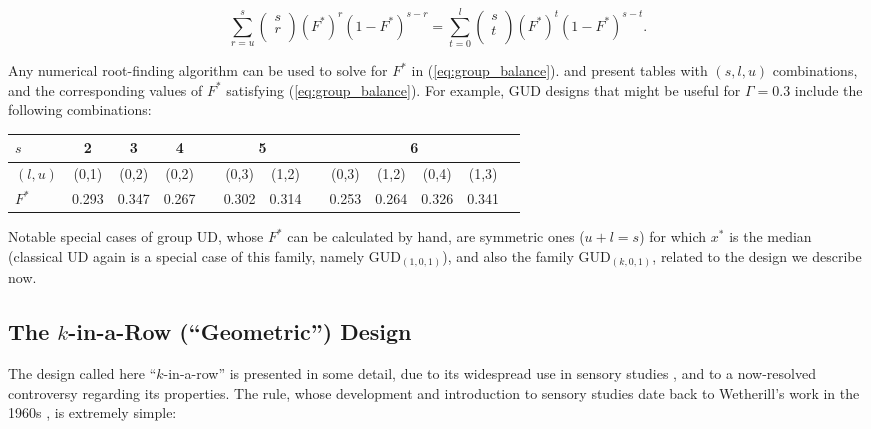 \begin{equation}\label{eq:group_balance}
\sum_{r=u}^s
\left(\begin{array}{c}
s\\
r\\
\end{array}\right) \left(F^*\right)^r(1-F^*)^{s-r}=
\sum_{t=0}^{l}
\left(\begin{array}{c}
s\\
t\\
\end{array}\right) \left(F^*\right)^t(1-F^*)^{s-t}.
\end{equation}

Any numerical root-finding algorithm can be used to solve for $F^*$ in (\ref{eq:group_balance}). \cite{Gezm:Flou:Grou:2006} and \cite{Ivan:Flou:Chun:Cumu:2007} present tables with $(s,l,u)$ combinations, and the corresponding values of $F^*$ satisfying (\ref{eq:group_balance}). For example, GUD designs that might be useful for $\Gamma=0.3$ include the following combinations:

\begin{small}
\begin{tabular}{lcccccccccccc}
\toprule
$s$ & 2 & 3 & 4 & & \multicolumn{2}{c}{5} &  &   \multicolumn{4}{c}{6} \\
\midrule
$(l,u)$ & (0,1)& (0,2)& (0,2)& & (0,3)& (1,2) & &  (0,3)& (1,2) &  (0,4)& (1,3) \\
$F^*$ & 0.293 &  0.347 & 0.267 & & 0.302 & 0.314  & & 0.253 & 0.264 & 0.326 & 0.341\\
\bottomrule
\end{tabular}
\end{small}

Notable special cases of group UD, whose $F^*$ can be calculated by hand, are symmetric ones ($u+l=s$) for which $x^*$ is the median (classical UD again is a special case of this family, namely GUD$_{(1,0,1)}$), and also the family GUD$_{(k,0,1)}$, related to the design we describe now.

\subsection{The $k$-in-a-Row (``Geometric'') Design}\label{sec:kr}

The design called here ``$k$-in-a-row'' is presented in some detail, due to its widespread use in sensory studies  \citep{Treu:Mini:1995}, and to a now-resolved controversy regarding its properties.  The rule, whose development and introduction to sensory studies date back to Wetherill's work in the 1960s  \citep{Weth:Sequ:1963,Weth:Levi:Sequ:1966}, is extremely simple:

